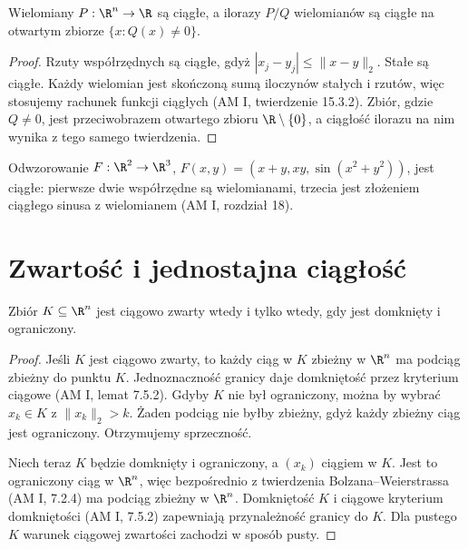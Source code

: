 \begin{wniosek}
\label{ma2:cor:multi-polynomials}
Wielomiany $P:\R^n\to\R$ są ciągłe, a ilorazy
$P/Q$ wielomianów są ciągłe na otwartym zbiorze
$\{x:Q(x)\ne0\}$.
\end{wniosek}
\begin{proof}
Rzuty współrzędnych są ciągłe, gdyż
$|x_j-y_j|\le\|x-y\|_2$. Stałe są ciągłe.
Każdy wielomian jest skończoną sumą iloczynów stałych
i rzutów, więc stosujemy rachunek funkcji ciągłych
(AM I, twierdzenie 15.3.2).
Zbiór, gdzie $Q\ne0$, jest przeciwobrazem otwartego
zbioru $\R\setminus\{0\}$, a ciągłość ilorazu na nim
wynika z tego samego twierdzenia.
\end{proof}

\begin{przyklad}
Odwzorowanie $F:\R^2\to\R^3$,
$F(x,y)=(x+y,xy,\sin(x^2+y^2))$, jest ciągłe:
pierwsze dwie współrzędne są wielomianami, trzecia
jest złożeniem ciągłego sinusa z wielomianem
(AM I, rozdział 18).
\end{przyklad}

\section{Zwartość i jednostajna ciągłość}

\begin{twierdzenie}
\label{ma2:thm:euclidean-compact}
Zbiór $K\subseteq\R^n$ jest ciągowo zwarty wtedy i tylko wtedy,
gdy jest domknięty i ograniczony.
\end{twierdzenie}
\begin{proof}
Jeśli $K$ jest ciągowo zwarty, to każdy ciąg w $K$
zbieżny w $\R^n$ ma podciąg zbieżny do punktu $K$.
Jednoznaczność granicy daje domkniętość przez kryterium
ciągowe (AM I, lemat 7.5.2).
Gdyby $K$ nie był ograniczony, można by wybrać
$x_k\in K$ z $\|x_k\|_2>k$. Żaden podciąg nie byłby
zbieżny, gdyż każdy zbieżny ciąg jest ograniczony.
Otrzymujemy sprzeczność.

Niech teraz $K$ będzie domknięty i ograniczony,
a $(x_k)$ ciągiem w $K$. Jest to ograniczony ciąg
w $\R^n$, więc bezpośrednio z twierdzenia
Bolzana--Weierstrassa (AM I, 7.2.4) ma podciąg
zbieżny w $\R^n$. Domkniętość $K$ i ciągowe kryterium
domkniętości (AM I, 7.5.2) zapewniają przynależność
granicy do $K$. Dla pustego $K$ warunek ciągowej
zwartości zachodzi w sposób pusty.
\end{proof}

